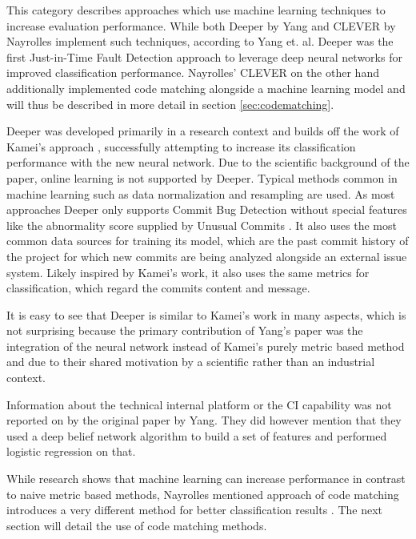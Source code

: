 This category describes approaches which use machine learning techniques to increase evaluation performance.
While both Deeper by Yang \cite{Yang2015} and CLEVER by Nayrolles \cite{Nayrolles2018} implement such techniques, according to Yang et. al. Deeper was the first Just-in-Time Fault Detection approach to leverage deep neural networks for improved classification performance. Nayrolles' CLEVER on the other hand additionally implemented code matching alongside a machine learning model and will thus be described in more detail in section \ref{sec:codematching}.

Deeper was developed primarily in a research context and builds off the work of Kamei's approach \cite{Kamei2013}, successfully attempting to increase its classification performance with the new neural network. Due to the scientific background of the paper, online learning is not supported by Deeper. Typical methods common in machine learning such as data normalization and resampling are used. As most approaches Deeper only supports Commit Bug Detection without special features like the abnormality score supplied by Unusual Commits \cite{Goyal2017}. It also uses the most common data sources for training its model, which are the past commit history of the project for which new commits are being analyzed alongside an external issue system. Likely inspired by Kamei's work, it also uses the same metrics for classification, which regard the commits content and message. 

It is easy to see that Deeper is similar to Kamei's work in many aspects, which is not surprising because the primary contribution of Yang's paper was the integration of the neural network instead of Kamei's purely metric based method and 
due to their shared motivation by a scientific rather than an industrial context.

Information about the technical internal platform or the CI capability was not reported on by the original paper by Yang. They did however mention that they used a deep belief network algorithm to build a set of features and performed logistic regression on that.

While research shows that machine learning can increase performance in contrast to naive metric based methods, Nayrolles mentioned approach of code matching introduces a very different method for better classification results \cite{Nayrolles2018}. The next section will detail the use of code matching methods.

